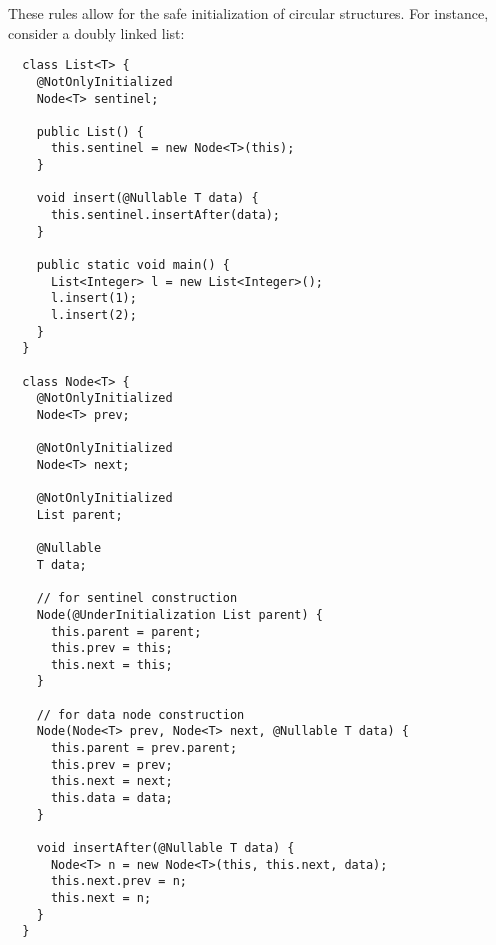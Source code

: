 These rules allow for the safe initialization of circular structures.  For instance,
consider a doubly linked list:

\begin{Verbatim}
  class List<T> {
    @NotOnlyInitialized
    Node<T> sentinel;

    public List() {
      this.sentinel = new Node<T>(this);
    }

    void insert(@Nullable T data) {
      this.sentinel.insertAfter(data);
    }

    public static void main() {
      List<Integer> l = new List<Integer>();
      l.insert(1);
      l.insert(2);
    }
  }

  class Node<T> {
    @NotOnlyInitialized
    Node<T> prev;

    @NotOnlyInitialized
    Node<T> next;

    @NotOnlyInitialized
    List parent;

    @Nullable
    T data;

    // for sentinel construction
    Node(@UnderInitialization List parent) {
      this.parent = parent;
      this.prev = this;
      this.next = this;
    }

    // for data node construction
    Node(Node<T> prev, Node<T> next, @Nullable T data) {
      this.parent = prev.parent;
      this.prev = prev;
      this.next = next;
      this.data = data;
    }

    void insertAfter(@Nullable T data) {
      Node<T> n = new Node<T>(this, this.next, data);
      this.next.prev = n;
      this.next = n;
    }
  }
\end{Verbatim}

